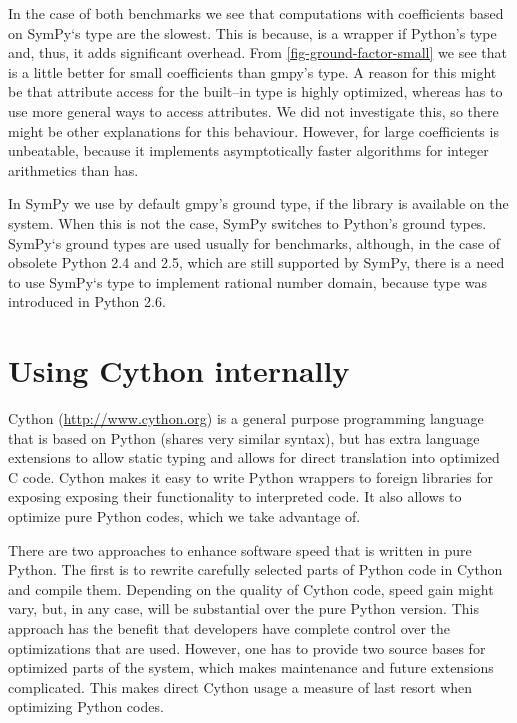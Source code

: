 In the case of both benchmarks we see that computations with coefficients based on SymPy`s
 type are the slowest. This is because,  is a wrapper if Python's 
type and, thus, it adds significant overhead. From \ref{fig-ground-factor-small} we see that
 is a little better for small coefficients than gmpy's  type. A reason for this
might be that attribute access for the built--in type is highly optimized, whereas  has
to use more general ways to access attributes. We did not investigate this, so there might be
other explanations for this behaviour. However, for large coefficients  is unbeatable,
because it implements asymptotically faster algorithms for integer arithmetics than  has.

In SymPy we use by default gmpy's ground type, if the library is available on the system. When
this is not the case, SymPy switches to Python's ground types. SymPy`s ground types are used
usually for benchmarks, although, in the case of obsolete Python 2.4 and 2.5, which are still
supported by SymPy, there is a need to use SymPy`s  type to implement rational
number domain, because  type was introduced in Python 2.6.
\section{Using Cython internally}\label{thesis-cython}

Cython (\href{http://www.cython.org}{http://www.cython.org}) is a general purpose programming language that is based on Python
(shares very similar syntax), but has extra language extensions to allow static typing and
allows for direct translation into optimized C code. Cython makes it easy to write Python
wrappers to foreign libraries for exposing exposing their functionality to interpreted code.
It also allows to optimize pure Python codes, which we take advantage of.

There are two approaches to enhance software speed that is written in pure Python. The first
is to rewrite carefully selected parts of Python code in Cython and compile them. Depending
on the quality of Cython code, speed gain might vary, but, in any case, will be substantial
over the pure Python version. This approach has the benefit that developers have complete
control over the optimizations that are used. However, one has to provide two source bases
for optimized parts of the system, which makes maintenance and future extensions complicated.
This makes direct Cython usage a measure of last resort when optimizing Python codes.

